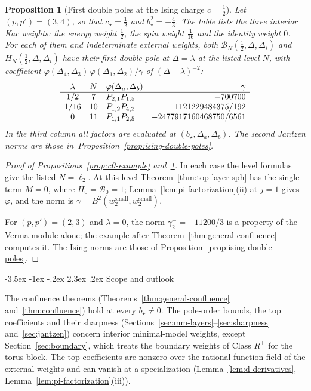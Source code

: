 \documentclass[twoside,10pt]{article}
\makeatletter
\numberwithin{equation}{section}
\theoremstyle{slbody}
\newtheorem{proposition}[theorem]{Proposition}
\theoremstyle{definition}
\theoremstyle{remark}
\renewcommand{\section}{%
  \@startsection{section}{1}{\z@}%
    {-3.5ex \@plus -1ex \@minus -.2ex}%
    {2.3ex \@plus .2ex}%
    {\normalfont\large\bfseries}}
\makeatother
\begin{document}
\begin{proposition}[First double poles at the Ising charge \(c=\tfrac12\)]
\label{prop:ising-example}
Let \((p,p')=(3,4)\), so that \(c_\star=\tfrac12\) and
\(b_\star^2=-\tfrac43\).  The table lists the three interior Kac weights: the
energy weight \(\tfrac12\), the spin weight \(\tfrac1{16}\) and the identity
weight \(0\).  For each of them and indeterminate external weights, both
\(\mathcal B_N(\tfrac12,\Delta,\Delta_i)\) and \(H_N(\tfrac12,\Delta,\Delta_i)\)
have their first double pole at \(\Delta=\lambda\) at the listed level \(N\),
with coefficient \(\varphi(\Delta_4,\Delta_3)\,\varphi(\Delta_1,\Delta_2)/\gamma\) of
\((\Delta-\lambda)^{-2}\):
\[
 \begin{array}{ccl r}
  \lambda & N & \varphi(\Delta_a,\Delta_b) & \gamma \\ \hline
  1/2 & 7 & P_{2,1}P_{1,5} & -700700 \\
  1/16 & 10 & P_{1,2}P_{4,2} & -1121229484375/192 \\
  0 & 11 & P_{1,1}P_{2,5} & -2477917160468750/6561
 \end{array}
\]
In the third column all factors are evaluated at \((b_\star,\Delta_a,\Delta_b)\).
The second Jantzen norms are those in~Proposition~\ref{prop:ising-double-poles}.
\end{proposition}

\begin{proof}[Proof of Propositions~\ref{prop:c0-example} and~\ref{prop:ising-example}]
In each case the level formulas give the listed \(N=\ell_2\).  At this level
Theorem~\ref{thm:top-layer-sph} has the single term \(M=0\), where
\(H_0=\mathcal B_0=1\); Lemma~\ref{lem:pi-factorization}(ii) at \(j=1\) gives
\(\varphi\), and the norm is
\(\gamma=B^2(w^{\mathrm{small}}_2,w^{\mathrm{small}}_2)\).

For \((p,p')=(2,3)\) and \(\lambda=0\), the norm \(\gamma^-_2=-11200/3\) is a
property of the Verma module alone; the example after
Theorem~\ref{thm:general-confluence} computes it.  The Ising norms are those of
Proposition~\ref{prop:ising-double-poles}.
\end{proof}

\section{Scope and outlook}\label{sec:scope}

The confluence theorems (Theorems~\ref{thm:general-confluence}
and~\ref{thm:confluence}) hold at every \(b_\star\neq0\).  The pole-order
bounds, the top coefficients and their sharpness
(Sections~\ref{sec:mm-layers}--\ref{sec:sharpness} and~\ref{sec:jantzen})
concern interior minimal-model weights, except Section~\ref{sec:boundary},
which treats the boundary weights of Class \(R^+\) for the torus block.  The top coefficients are nonzero
over the rational function field of the external weights and can vanish at a
specialization (Lemma~\ref{lem:d-derivatives},
Lemma~\ref{lem:pi-factorization}(iii)).
\end{document}
